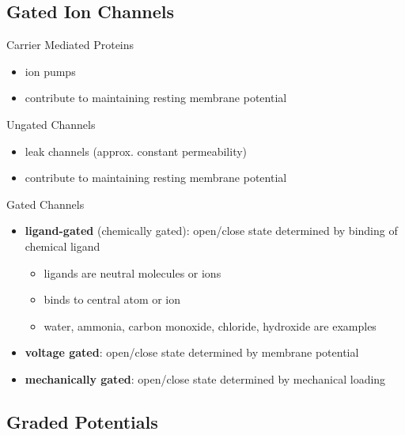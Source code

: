 \documentclass[11pt,fleqn]{book} %
\begin{document}
\subsection{Gated Ion Channels}
\begin{descriptions}
    \item[Carrier Mediated Proteins]\begin{descriptions}
    \end{descriptions} 
    \begin{itemize}
        \item ion pumps
        \item contribute to maintaining resting membrane potential
    \end{itemize}
    \item[Ungated Channels]\begin{descriptions}
    \end{descriptions}    
    \begin{itemize}
        \item leak channels (approx. constant permeability)
        \item contribute to maintaining resting membrane potential
    \end{itemize}
    \item[Gated Channels]\begin{descriptions}
    \end{descriptions}
    \begin{itemize}
        \item \textbf{ligand-gated} (chemically gated): open/close state determined by binding of chemical ligand
        \begin{itemize}
            \item ligands are neutral molecules or ions
            \item binds to central atom or ion
            \item water, ammonia, carbon monoxide, chloride, hydroxide are examples
        \end{itemize}
        \item \textbf{voltage gated}: open/close state determined by membrane potential
        \item \textbf{mechanically gated}: open/close state determined by mechanical loading
    \end{itemize}
\end{descriptions}
\subsection{Graded Potentials}
\end{document}
